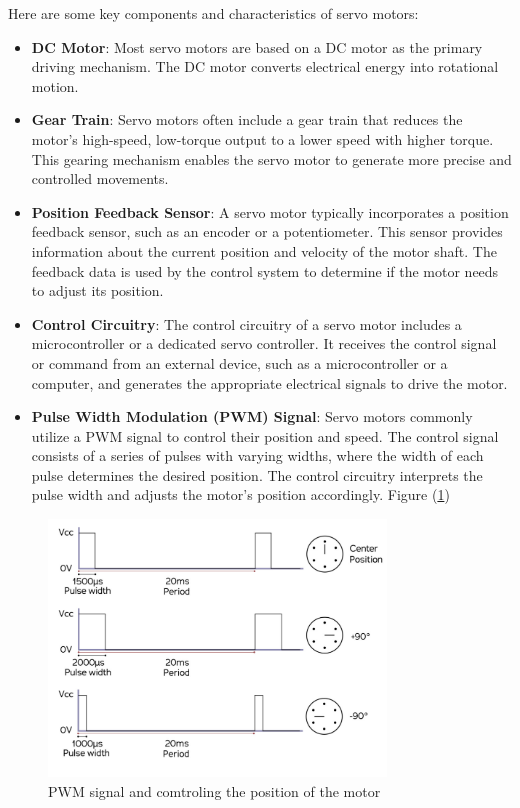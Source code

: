 \documentclass[english]{article}
\begin{document}
Here are some key components and characteristics of servo motors: 
\begin{itemize}
    \item \textbf{DC Motor}: Most servo motors are based on a DC motor
     as the primary driving mechanism. The DC motor converts electrical 
     energy into rotational motion. 
     \item \textbf{Gear Train}: Servo motors often include a gear train
      that reduces the motor's high-speed, low-torque output to a lower
       speed with higher torque. This gearing mechanism enables the servo
      motor to generate more precise and controlled movements.
    \item \textbf{Position Feedback Sensor}: A servo motor typically 
    incorporates a position feedback sensor, such as an encoder or a
     potentiometer. This sensor provides information about the current 
     position and velocity of the motor shaft. The feedback data is used
      by the control system to determine if the motor needs to adjust its 
    position.
    \item \textbf{Control Circuitry}: The control circuitry of a servo motor
     includes a microcontroller or a dedicated servo controller.
      It receives the control signal or command from an external device,
       such as a microcontroller or a computer, and generates the appropriate
        electrical signals to drive the motor. 
    \item \textbf{Pulse Width Modulation (PWM) Signal}: Servo motors commonly 
    utilize a PWM signal to control their position and speed. The control signal
     consists of a series of pulses with varying widths, where the width of each 
     pulse determines the desired position. The control circuitry interprets the
      pulse width and adjusts the motor's position accordingly. Figure (\ref{fig:PWM})
\end{itemize}
\begin{figure}[!h]
    \centering
    \includegraphics[width=0.80\textwidth, height=0.35\textheight]{figures/PWM.png}
    \caption{PWM signal and comtroling the position of the motor}
    \label{fig:PWM}
\end{figure}
\end{document}
